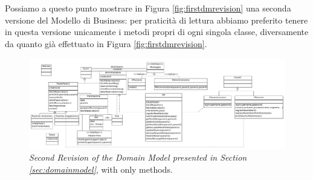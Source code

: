 Possiamo a questo punto mostrare in Figura \vref{fig:firstdmrevision} una seconda
versione del Modello di Business: per praticità di lettura abbiamo preferito
tenere in questa versione unicamente i metodi propri di ogni singola classe,
diversamente da quanto già effettuato in Figura \vref{fig:firstdmrevision}.

\begin{figure}[p]
\includegraphics[scale=0.5,angle=90]{svgs2/modellodiDominio}
\caption{\textit{Second Revision of the Domain Model presented in Section \vref{sec:domainmodel}}, with only methods.}
\label{fig:firstdmrevision}
\end{figure} 

